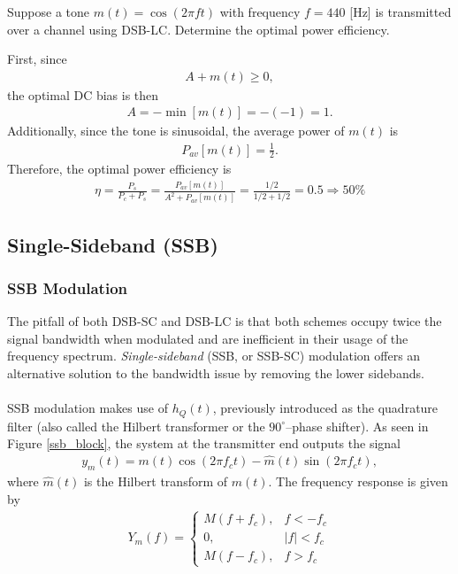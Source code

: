 \documentclass{report}
\begin{document}
\begin{example}
    Suppose a tone $m(t)=\cos(2\pi ft)$ with frequency $f=440$ [Hz] is transmitted over a channel using DSB-LC. Determine the optimal power efficiency.
\end{example}
\begin{solution}
    First, since
    \begin{align*}
        A + m(t) \geq 0,
    \end{align*}
    the optimal DC bias is then 
    \begin{align*}
        A = -\min[m(t)] = -(-1) = 1.
    \end{align*}
    Additionally, since the tone is sinusoidal, the average power of $m(t)$ is 
    \begin{align*}
        P_{av}[m(t)] = \frac{1}{2}.
    \end{align*}
    Therefore, the optimal power efficiency is 
    \begin{align*}
        \eta = \frac{P_s}{P_c + P_s} = \frac{P_{av}[m(t)]}{A^2 + P_{av}[m(t)]} = \frac{1/2}{1/2 + 1/2} = 0.5 \Longrightarrow 50\%
    \end{align*}
\end{solution}

\subsection{Single-Sideband (SSB)}
\subsubsection{SSB Modulation}
The pitfall of both DSB-SC and DSB-LC is that both schemes occupy twice the signal bandwidth when modulated and are inefficient in their usage of 
the frequency spectrum. \emph{Single-sideband} (SSB, or SSB-SC) modulation offers an alternative solution to the bandwidth issue by removing the lower sidebands. 
\\ \\
SSB modulation makes use of $h_Q(t)$, previously introduced as the quadrature filter (also called the Hilbert transformer or the $90^{\circ}$--phase shifter).
As seen in Figure \ref{ssb_block}, the system at the transmitter end outputs the signal 
\begin{align}
    y_m(t) = m(t)\cos(2\pi f_c t) - \hat{m}(t)\sin(2\pi f_c t),
\end{align}
where $\hat{m}(t)$ is the Hilbert transform of $m(t)$. The frequency response is given by 
\begin{align}
    Y_m(f) = 
    \begin{cases}
        M(f+f_c), & f<-f_c \\
        0, & |f|<f_c \\ 
        M(f-f_c), & f>f_c
    \end{cases}
\end{align}
\end{document}
